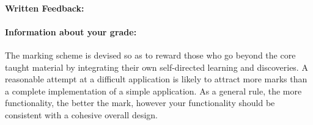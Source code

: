 \documentclass[letterpaper,11pt]{../resources/texMemo}
\begin{document}
\maketitle

\paragraph{Written Feedback:}





\paragraph{Information about your grade:} The marking scheme is devised so as to reward those who go beyond the core taught material by integrating their own self-directed learning and discoveries. A reasonable attempt at a difficult application is likely to attract more marks than a complete implementation of a simple application. As a general rule, the more functionality, the better the mark, however your functionality should be consistent with a cohesive overall design.
\end{document}
